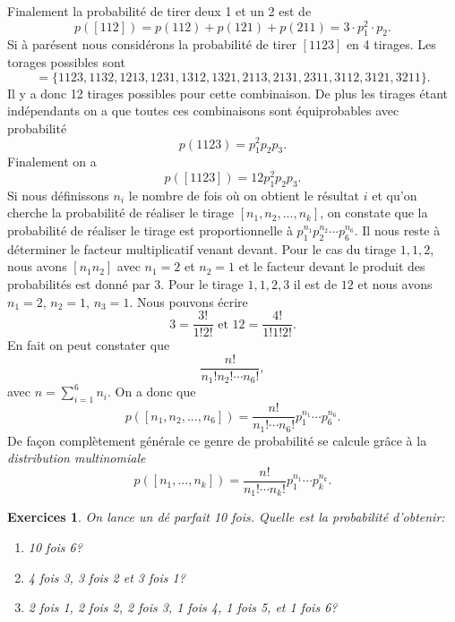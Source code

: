 \documentclass[a4paper,12pt]{book}
\newtheorem*{exercices}{Exercices}
\begin{document}
Finalement la probabilité de tirer deux 1 et un 2 est de
\begin{equation}
 p([112])=p(112)+p(121)+p(211)=3\cdot p_1^2\cdot p_2.
\end{equation}
Si à parésent nous considérons la probabilité de tirer $[1123]$ en 4 tirages. Les torages possibles sont
\begin{equation}
 [1123]=\{1123, 1132, 1213, 1231, 1312, 1321, 2113, 2131, 2311, 3112, 3121, 3211\}.
\end{equation}
Il y a donc 12 tirages possibles pour cette combinaison. De plus les tirages étant indépendants
on a que toutes ces combinaisons sont équiprobables avec probabilité
\begin{equation}
 p(1123)=p_1^2p_2p_3.
\end{equation}
Finalement on a 
\begin{equation}
 p([1123])=12 p_1^2p_2p_3.
\end{equation}
Si nous définissons $n_i$ le nombre de fois où on obtient le résultat $i$ et qu'on cherche la probabilité de réaliser le tirage $[n_1,n_2,...,n_k]$,
on constate que la probabilité de réaliser le tirage est proportionnelle à 
$p_1^{n_1}p_2^{n_2}\cdots p_6^{n_6}$. Il nous reste à déterminer le facteur multiplicatif venant devant. 
Pour le cas du tirage $1,1,2$, nous avons $[n_1n_2]$ avec $n_1=2$ et $n_2=1$ et le facteur devant le produit des probabilités est 
donné par $3$. Pour le tirage $1,1,2,3$ il est de $12$ et nous avons $n_1=2$, $n_2=1$, $n_3=1$. Nous pouvons écrire 
\begin{equation}
 3=\frac{3!}{1!2!}\mbox{ et } 12=\frac{4!}{1!1!2!}. 
\end{equation}
En fait on peut constater que
\begin{equation}
 \frac{n!}{n_1!n_2!\cdots n_6!},
\end{equation}
avec $n=\sum_{i=1}^6 n_i$. On a donc que 
\begin{equation}
 p([n_1,n_2,...,n_6])=\frac{n!}{n_1!\cdots n_6!}p_1^{n_1}\cdots p_6^{n_6}.
\end{equation}
De façon complètement générale ce genre de probabilité se calcule grâce à la \textit{distribution multinomiale}
\begin{equation}
 p([n_1,...,n_k])=\frac{n!}{n_1!\cdots n_k!}p_1^{n_1}\cdots p_k^{n_k}.
\end{equation}

\begin{exercices}
\hfill\break
  On lance un dé parfait 10 fois. Quelle est la probabilité d'obtenir:
 \begin{enumerate}
  \item 10 fois 6?
  \item 4 fois 3, 3 fois 2 et 3 fois 1?
  \item 2 fois 1, 2 fois 2, 2 fois 3, 1 fois 4, 1 fois 5, et 1 fois 6?
 \end{enumerate}

\end{exercices}
\end{document}
